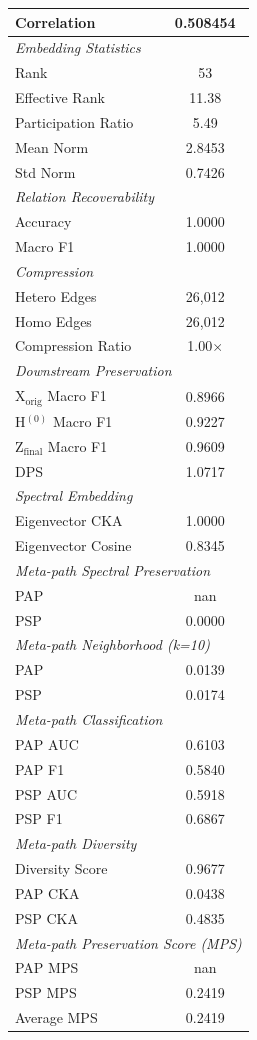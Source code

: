 \begin{table}[h]
\begin{tabular}{lc}
Correlation & 0.508454 \\
\midrule
\multicolumn{2}{l}{\textit{Embedding Statistics}} \\
Rank & 53 \\
Effective Rank & 11.38 \\
Participation Ratio & 5.49 \\
Mean Norm & 2.8453 \\
Std Norm & 0.7426 \\
\midrule
\multicolumn{2}{l}{\textit{Relation Recoverability}} \\
Accuracy & 1.0000 \\
Macro F1 & 1.0000 \\
\midrule
\multicolumn{2}{l}{\textit{Compression}} \\
Hetero Edges & 26,012 \\
Homo Edges & 26,012 \\
Compression Ratio & 1.00$\times$ \\
\midrule
\multicolumn{2}{l}{\textit{Downstream Preservation}} \\
X$_{\mathrm{orig}}$ Macro F1 & 0.8966 \\
H$^{(0)}$ Macro F1 & 0.9227 \\
Z$_{\mathrm{final}}$ Macro F1 & 0.9609 \\
DPS & 1.0717 \\
\midrule
\multicolumn{2}{l}{\textit{Spectral Embedding}} \\
Eigenvector CKA & 1.0000 \\
Eigenvector Cosine & 0.8345 \\
\midrule
\multicolumn{2}{l}{\textit{Meta-path Spectral Preservation}} \\
PAP & nan \\
PSP & 0.0000 \\
\midrule
\multicolumn{2}{l}{\textit{Meta-path Neighborhood (k=10)}} \\
PAP & 0.0139 \\
PSP & 0.0174 \\
\midrule
\multicolumn{2}{l}{\textit{Meta-path Classification}} \\
PAP AUC & 0.6103 \\
PAP F1 & 0.5840 \\
PSP AUC & 0.5918 \\
PSP F1 & 0.6867 \\
\midrule
\multicolumn{2}{l}{\textit{Meta-path Diversity}} \\
Diversity Score & 0.9677 \\
PAP CKA & 0.0438 \\
PSP CKA & 0.4835 \\
\midrule
\multicolumn{2}{l}{\textit{Meta-path Preservation Score (MPS)}} \\
PAP MPS & nan \\
PSP MPS & 0.2419 \\
Average MPS & 0.2419 \\
\bottomrule
\end{tabular}
\end{table}